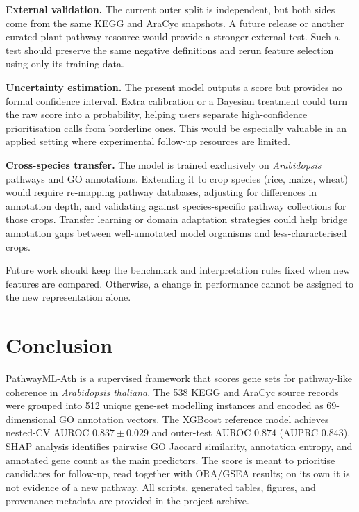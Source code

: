 \documentclass[12pt,letterpaper,oneside,openany]{book}
\begin{document}
\textbf{External validation.} The current outer split is independent, but both sides come from the same KEGG and AraCyc snapshots. A future release or another curated plant pathway resource would provide a stronger external test. Such a test should preserve the same negative definitions and rerun feature selection using only its training data.

\textbf{Uncertainty estimation.} The present model outputs a score but provides no formal confidence interval. Extra calibration or a Bayesian treatment could turn the raw score into a probability, helping users separate high-confidence prioritisation calls from borderline ones. This would be especially valuable in an applied setting where experimental follow-up resources are limited.

\textbf{Cross-species transfer.} The model is trained exclusively on \textit{Arabidopsis} pathways and GO annotations. Extending it to crop species (rice, maize, wheat) would require re-mapping pathway databases, adjusting for differences in annotation depth, and validating against species-specific pathway collections for those crops. Transfer learning or domain adaptation strategies could help bridge annotation gaps between well-annotated model organisms and less-characterised crops.

Future work should keep the benchmark and interpretation rules fixed when new features are compared. Otherwise, a change in performance cannot be assigned to the new representation alone.


\chapter{Conclusion}
\label{sec:conclusion}

PathwayML-Ath is a supervised framework that scores gene sets for pathway-like coherence in \textit{Arabidopsis thaliana}. The 538 KEGG and AraCyc source records were grouped into 512 unique gene-set modelling instances and encoded as 69-dimensional GO annotation vectors. The XGBoost reference model achieves nested-CV AUROC $0.837 \pm 0.029$ and outer-test AUROC $0.874$ (AUPRC $0.843$). SHAP analysis identifies pairwise GO Jaccard similarity, annotation entropy, and annotated gene count as the main predictors. The score is meant to prioritise candidates for follow-up, read together with ORA/GSEA results; on its own it is not evidence of a new pathway. All scripts, generated tables, figures, and provenance metadata are provided in the project archive.
\end{document}
